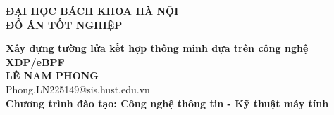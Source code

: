 \documentclass[DoAn.tex]{subfiles}
\begin{document}
\begin{titlepage}
\thispagestyle{empty}
\begin{center}

{\textbf{\large{ĐẠI HỌC BÁCH KHOA HÀ NỘI}}}\\[4cm]

{\textbf{\huge{ ĐỒ ÁN TỐT NGHIỆP}}}\\[1cm]
{\textbf{\Large{Xây dựng tường lửa kết hợp thông minh dựa trên công nghệ XDP/eBPF}}\\[1cm]

{\textbf{\large{LÊ NAM PHONG}}}\\
{\large{Phong.LN225149@sis.hust.edu.vn}}\\[0.5cm]

{\textbf{\large{Chương trình đào tạo: Công nghệ thông tin - Kỹ thuật máy tính
}}}\\

\vspace{4cm}
\begin{table}[H]
\centering
{}
\end{table}}
\end{center}



\end{titlepage}
\end{document}
